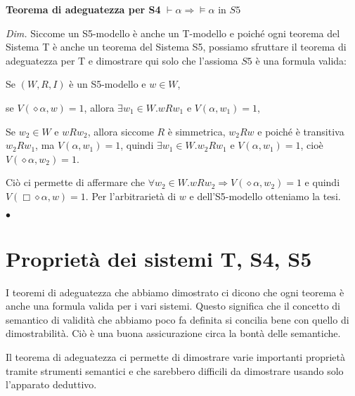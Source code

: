 \documentclass[a4paper, titlepage, 12pt]{report}
\begin{document}
\begin{flushleft}
\textbf{Teorema di adeguatezza per S4}
$\vdash \alpha \Rightarrow \vDash \alpha$ in $S5$

\textit{Dim.}
Siccome un S5-modello è anche un T-modello e poiché ogni teorema del Sistema T
è anche un teorema del Sistema S5, possiamo sfruttare il teorema di adeguatezza per T
e dimostrare qui solo che l'assioma $S5$ è una formula valida:

Se $(W, R, I)$ è un S5-modello e $w \in W$,

se $V(\diamond \alpha, w) = 1$, allora $\exists w_1 \in W. wRw_1$ e $V(\alpha, w_1) = 1$,

Se $w_2 \in W$ e $wRw_2$, allora siccome $R$ è simmetrica, $w_2Rw$ e poiché
è transitiva $w_2Rw_1$, ma $V(\alpha, w_1) = 1$, quindi
$\exists w_1 \in W. w_2Rw_1$ e $V(\alpha, w_1) = 1$, cioè $V(\diamond \alpha, w_2) = 1$.

Ciò ci permette di affermare che $\forall w_2 \in W. wRw_2 \Rightarrow V(\diamond \alpha, w_2) = 1$
e quindi $V(\Box \diamond \alpha, w) = 1$.
Per l'arbitrarietà di $w$ e dell'S5-modello otteniamo la tesi.

\begin{flushright}
$\bullet$
\end{flushright}
\end{flushleft}

\section{Proprietà dei sistemi T, S4, S5}
I teoremi di adeguatezza che abbiamo dimostrato ci dicono che ogni teorema
è anche una formula valida per i vari sistemi.
Questo significa che il concetto di semantico di validità che abbiamo poco fa definita
si concilia bene con quello di dimostrabilità. Ciò è una buona assicurazione circa
la bontà delle semantiche.

Il teorema di adeguatezza ci permette di dimostrare varie importanti proprietà tramite
strumenti semantici e che sarebbero difficili da dimostrare usando solo l'apparato deduttivo.
\end{document}
